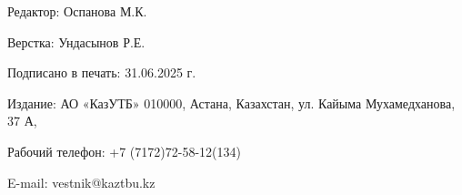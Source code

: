 \newpage

\thispagestyle{empty}
\null
\vfill
\begin{center}
Редактор: Оспанова М.К.

Верстка: Ундасынов Р.Е.

Подписано в печать: 31.06.2025 г.

Издание: АО «КазУТБ» 010000, Астана, Казахстан, ул. Кайыма Мухамедханова, 37 А,

Рабочий телефон: +7 (7172)72-58-12(134)

E-mail: vestnik@kaztbu.kz
\end{center}
\vfill
\null
